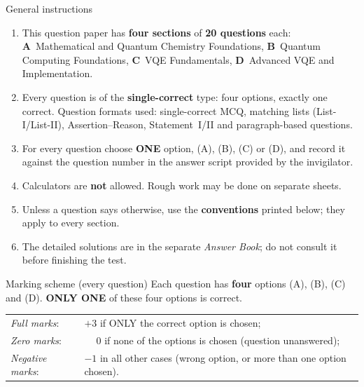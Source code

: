 \documentclass[11pt,a4paper]{article}
\begin{document}
\vspace{6pt}
\begin{infobox}{General instructions}
\begin{enumerate}[leftmargin=1.4em, itemsep=1pt, topsep=1pt]
\item This question paper has \textbf{four sections} of \textbf{20 questions} each:
\textbf{A}~Mathematical and Quantum Chemistry Foundations, \textbf{B}~Quantum Computing Foundations, \textbf{C}~VQE Fundamentals, \textbf{D}~Advanced VQE and Implementation.
\item Every question is of the \textbf{single-correct} type: four options, exactly one correct. Question formats used:
single-correct MCQ, matching lists (List-I/List-II), Assertion--Reason, Statement~I/II and paragraph-based questions.
\item For every question choose \textbf{ONE} option, (A), (B), (C) or (D), and record it against the question number in the answer script provided by the invigilator.
\item Calculators are \textbf{not} allowed. Rough work may be done on separate sheets.
\item Unless a question says otherwise, use the \textbf{conventions} printed below; they apply to every section.
\item The detailed solutions are in the separate \emph{Answer Book}; do not consult it before finishing the test.
\end{enumerate}
\end{infobox}
\begin{infobox}{Marking scheme (every question)}
Each question has \textbf{four} options (A), (B), (C) and (D). \textbf{ONLY ONE} of these four options is correct.\\[2pt]
\begin{tabular}{@{}ll@{}}
\emph{Full marks}: & $+3$ if ONLY the correct option is chosen;\\
\emph{Zero marks}: & $\phantom{+}0$ if none of the options is chosen (question unanswered);\\
\emph{Negative marks}: & $-1$ in all other cases (wrong option, or more than one option chosen).
\end{tabular}
\end{infobox}
\end{document}

